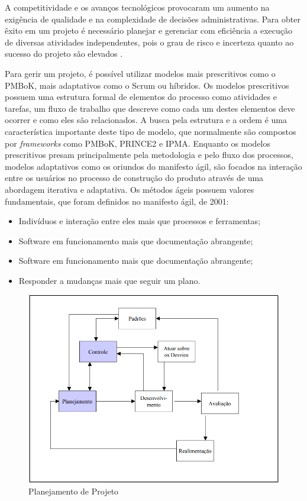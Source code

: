 A competitividade e os avanços tecnológicos provocaram um aumento na exigência de qualidade e na complexidade de decisões administrativas. Para obter êxito em um projeto é necessário planejar e gerenciar com eficiência a execução de diversas atividades independentes, pois o grau de risco e incerteza quanto ao sucesso do projeto são elevados \cite{Maria_Isabel_2001}.

Para gerir um projeto, é possível utilizar modelos mais prescritivos como o PMBoK, mais adaptativos como o Scrum ou híbridos.
Os modelos prescritivos possuem uma estrutura formal de elementos do processo como atividades e tarefas, um fluxo de trabalho que descreve como cada um destes elementos deve ocorrer e como eles são relacionados. A busca pela estrutura e a ordem é uma característica importante deste tipo de modelo, que normalmente são compostos por \textit{frameworks} como PMBoK, PRINCE2 e IPMA\cite{Julia_Mara_2018}.
Enquanto os modelos prescritivos presam principalmente pela metodologia e pelo fluxo dos processos, modelos adaptativos como os oriundos do manifesto ágil, são focados na interação entre os usuários no processo de construção do produto através de uma abordagem iterativa e adaptativa\cite{Julia_Mara_2018}.
Os métodos ágeis possuem valores fundamentais, que foram definidos no manifesto ágil, de 2001:
\begin{itemize}
	\item Indivíduos e interação entre eles mais que processos e ferramentas;
	\item Software em funcionamento mais que documentação abrangente;
	\item Software em funcionamento mais que documentação abrangente;
	\item Responder a mudanças mais que seguir um plano.
\end{itemize}

\begin{figure}[htb]
	\caption{\label{planejamento_21}Planejamento de Projeto}
	\begin{center}
		\includegraphics[scale=0.45]{./Figuras/planejamento_projeto.png}
	\end{center}
\end{figure}

